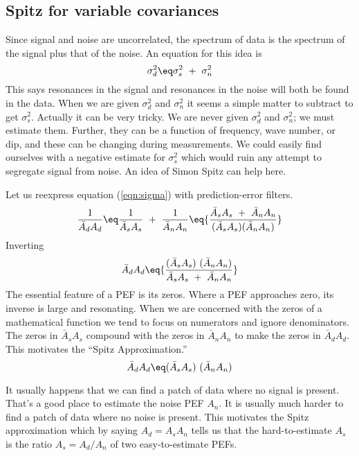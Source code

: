 \subsection{Spitz for variable covariances}
\par
Since signal and noise are uncorrelated,
the spectrum of data is the spectrum of the signal plus that of the noise.
An equation for this idea is
\begin{equation}
\label{eqn:sigma}
\sigma_d^2 \eq 
\sigma_s^2 \ + \ 
\sigma_n^2
\end{equation}
This says resonances in the signal
and resonances in the noise
will both be found in the data.
When we are given $\sigma_d^2$ and $\sigma_n^2$ it seems a simple
matter to subtract to get $\sigma_s^2$.
Actually it can be very tricky.
We are never given $\sigma_d^2$ and $\sigma_n^2$;
we must estimate them.
Further, they can be a function of frequency, wave number, or dip,
and these can be changing during measurements.
We could easily find ourselves with a negative estimate for
$\sigma_s^2$ which would ruin any attempt to segregate signal from noise.
An idea of Simon Spitz can help here.

\par
Let us reexpress equation (\ref{eqn:sigma}) with prediction-error filters.
\begin{equation}
\frac{1}{ \bar A_d A_d} \eq
\frac{1}{ \bar A_s A_s} \ + \ 
\frac{1}{ \bar A_n A_n}
\eq
{
	  \frac{{\bar A_s A_s} \ +\  {\bar A_n A_n}}{( {\bar A_s A_s} )   ( {\bar A_n A_n})}
}
\end{equation}
Inverting
\begin{equation}
{ \bar A_d A_d} \eq
{
	\frac{( {\bar A_s A_s} ) \  ( {\bar A_n A_n})}{{\bar A_s A_s} \ +\  {\bar A_n A_n}}
}
\end{equation}
The essential feature of a PEF is its zeros.
Where a PEF approaches zero, its inverse is large and resonating.
When we are concerned with the zeros of a mathematical function
we tend to focus on numerators and ignore denominators.
The zeros in
${\bar A_s A_s}$
compound with the zeros in
${\bar A_n A_n}$
to make the zeros in 
${\bar A_d A_d}$.
This motivates the ``Spitz Approximation.''
\begin{equation}
{ \bar A_d A_d} \eq
	( {\bar A_s A_s} )\   ( {\bar A_n A_n})
\end{equation}

\par
It usually happens that we can
find a patch of data where no signal is present.
That's a good place to estimate the noise PEF $A_n$.
It is usually much harder to find a patch of data where no noise is present.
This motivates the Spitz approximation which by saying
$ A_d = A_s  A_n $
tells us that the hard-to-estimate $A_s$ is the ratio
$ A_s = A_d /  A_n $
of two easy-to-estimate PEFs.


